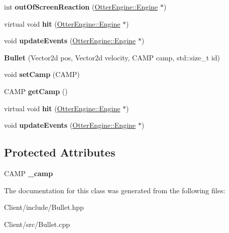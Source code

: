 \begin{DoxyCompactItemize}
\item 
int {\bfseries out\+Of\+Screen\+Reaction} (\hyperlink{class_otter_engine_1_1_engine}{Otter\+Engine\+::\+Engine} $\ast$)\hypertarget{class_bullet_ad5a57b47c75df32dadac07cef201bdd5}{}\label{class_bullet_ad5a57b47c75df32dadac07cef201bdd5}

\item 
virtual void {\bfseries hit} (\hyperlink{class_otter_engine_1_1_engine}{Otter\+Engine\+::\+Engine} $\ast$)\hypertarget{class_bullet_a85fabc20d6230cb0bcdb229f5a2fcf6c}{}\label{class_bullet_a85fabc20d6230cb0bcdb229f5a2fcf6c}

\item 
void {\bfseries update\+Events} (\hyperlink{class_otter_engine_1_1_engine}{Otter\+Engine\+::\+Engine} $\ast$)\hypertarget{class_bullet_a6287ae6167d56c156bcf5eab78c763ab}{}\label{class_bullet_a6287ae6167d56c156bcf5eab78c763ab}

\item 
{\bfseries Bullet} (Vector2d pos, Vector2d velocity, C\+A\+MP camp, std\+::size\+\_\+t id)\hypertarget{class_bullet_a6cdcd55c378f0d80062b5405b0a93e4f}{}\label{class_bullet_a6cdcd55c378f0d80062b5405b0a93e4f}

\item 
void {\bfseries set\+Camp} (C\+A\+MP)\hypertarget{class_bullet_a186c9b6ec673e1831756b5a2bc14d773}{}\label{class_bullet_a186c9b6ec673e1831756b5a2bc14d773}

\item 
C\+A\+MP {\bfseries get\+Camp} ()\hypertarget{class_bullet_ae08dc6092ebc665f64a718a33078333b}{}\label{class_bullet_ae08dc6092ebc665f64a718a33078333b}

\item 
virtual void {\bfseries hit} (\hyperlink{class_otter_engine_1_1_engine}{Otter\+Engine\+::\+Engine} $\ast$)\hypertarget{class_bullet_a85fabc20d6230cb0bcdb229f5a2fcf6c}{}\label{class_bullet_a85fabc20d6230cb0bcdb229f5a2fcf6c}

\item 
void {\bfseries update\+Events} (\hyperlink{class_otter_engine_1_1_engine}{Otter\+Engine\+::\+Engine} $\ast$)\hypertarget{class_bullet_a6287ae6167d56c156bcf5eab78c763ab}{}\label{class_bullet_a6287ae6167d56c156bcf5eab78c763ab}

\end{DoxyCompactItemize}
\subsection*{Protected Attributes}
\begin{DoxyCompactItemize}
\item 
C\+A\+MP {\bfseries \+\_\+camp}\hypertarget{class_bullet_afa23ebddc6b2bfe95539201ed1a9ebbb}{}\label{class_bullet_afa23ebddc6b2bfe95539201ed1a9ebbb}

\end{DoxyCompactItemize}


The documentation for this class was generated from the following files\+:\begin{DoxyCompactItemize}
\item 
Client/include/Bullet.\+hpp\item 
Client/src/Bullet.\+cpp\end{DoxyCompactItemize}
